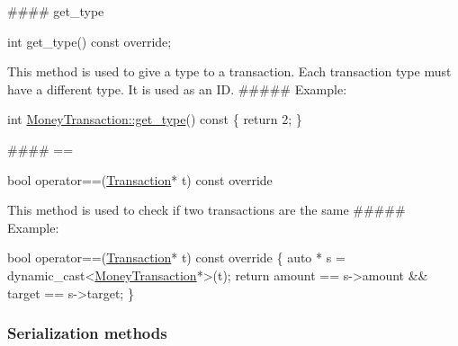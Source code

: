 \#\#\#\# get\+\_\+type 
\begin{DoxyCode}
\textcolor{keywordtype}{int} get\_type() \textcolor{keyword}{const override};
\end{DoxyCode}
 This method is used to give a type to a transaction. Each transaction type must have a different type. It is used as an ID. \#\#\#\#\# Example\+: 
\begin{DoxyCode}
\textcolor{keywordtype}{int} \mbox{\hyperlink{classMoneyTransaction_a705918a47c0471ee7cf82bcdf0aeb5ef}{MoneyTransaction::get\_type}}()\textcolor{keyword}{ const }\{
    \textcolor{keywordflow}{return} 2;
\}
\end{DoxyCode}
 \#\#\#\# == 
\begin{DoxyCode}
\textcolor{keywordtype}{bool} operator==(\mbox{\hyperlink{classTransaction}{Transaction}}* t) \textcolor{keyword}{const} \textcolor{keyword}{override}
\end{DoxyCode}
 This method is used to check if two transactions are the same \#\#\#\#\# Example\+: 
\begin{DoxyCode}
\textcolor{keywordtype}{bool} operator==(\mbox{\hyperlink{classTransaction}{Transaction}}* t)\textcolor{keyword}{ const override }\{
    \textcolor{keyword}{auto} * s = \textcolor{keyword}{dynamic\_cast<}\mbox{\hyperlink{classMoneyTransaction}{MoneyTransaction}}*\textcolor{keyword}{>}(t);
    \textcolor{keywordflow}{return} amount == s->amount \&\& target == s->target;
\}
\end{DoxyCode}
 \subsubsection*{Serialization methods}

